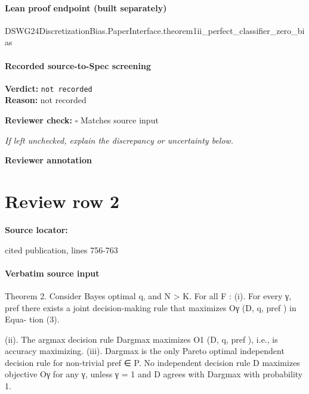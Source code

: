 \documentclass[10pt]{article}
\newcommand{\reviewerbox}{%
  \par\noindent\fbox{\parbox{0.96\linewidth}{\rule{0pt}{0.38in}}}\par
}
\newcommand{\reviewmatch}[1]{%
  \par\noindent\textbf{Reviewer check:} $\square$\; #1\par
  \noindent\emph{If left unchecked, explain the discrepancy or uncertainty below.}\par
}
\begin{document}
\paragraph{Lean proof endpoint (built separately)}\begin{ReviewVerbatim}
DSWG24DiscretizationBias.PaperInterface.theorem1ii_perfect_classifier_zero_bias
\end{ReviewVerbatim}

\paragraph{Recorded source-to-Spec screening}
\textbf{Verdict:} \texttt{not recorded}
\\
\textbf{Reason:} not recorded
\reviewmatch{Matches source input}
\noindent\textbf{Reviewer annotation}\par
\reviewerbox
\clearpage
\hypertarget{source-claim-94d82572ce30633e}{}
\section*{Review row 2}
\textbf{Source locator:} {\footnotesize\raggedright cited publication, lines 756-\allowbreak{}763\par}
\paragraph{Verbatim source input}
\begin{ReviewVerbatim}
Theorem 2. Consider Bayes optimal q, and N > K. For all F :
   (i). For every γ, pref there exists a joint decision-making rule that maximizes Oγ (D, q, pref ) in Equa-
        tion (3).

  (ii). The argmax decision rule Dargmax maximizes O1 (D, q, pref ), i.e., is accuracy maximizing.
 (iii). Dargmax is the only Pareto optimal independent decision rule for non-trivial pref ∈ P. No independent
        decision rule D maximizes objective Oγ for any γ, unless γ = 1 and D agrees with Dargmax with
        probability 1.
\end{ReviewVerbatim}
\end{document}
